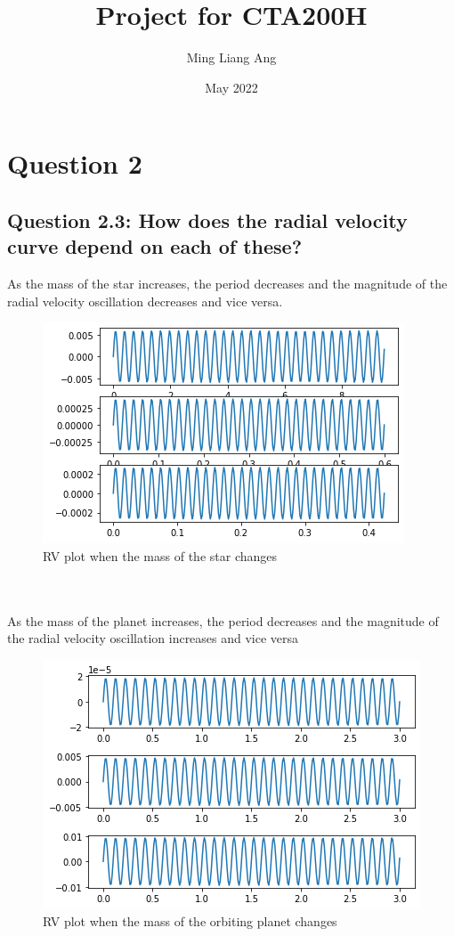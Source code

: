 \documentclass{article}
\title{Project for CTA200H}
\author{Ming Liang Ang}
\date{May 2022}
\begin{document}
\maketitle

\section{Question 2}
\subsection{Question 2.3: How does the radial velocity curve depend on each of these?}
As the mass of the star increases, the period decreases and the magnitude of the radial velocity oscillation decreases and vice versa. 
\begin{figure}[!h]
    \begin{center}
    \includegraphics[scale=0.5]{mass_star.png}
    \end{center}
  \caption{RV plot when the mass of the star changes}
\end{figure}
\\\\
As the mass of the planet increases, the period decreases and the magnitude of the radial velocity oscillation increases and vice versa
\begin{figure}[!h]
    \begin{center}
    \includegraphics[scale=0.4]{mass_planet.png}
    \end{center}
  \caption{RV plot when the mass of the orbiting planet changes}
\end{figure}
\end{document}

